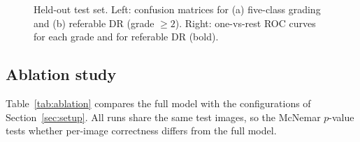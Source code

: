 \begin{figure}[!htbp]
\centering
\begin{minipage}[c]{0.6\linewidth}\centering
{}
\end{minipage}\hfill
\begin{minipage}[c]{0.37\linewidth}\centering
{}
\end{minipage}
\caption{Held-out test set. Left: confusion matrices for (a) five-class grading and (b) referable DR (grade $\geq2$).
Right: one-vs-rest ROC curves for each grade and for referable DR (bold).}
\label{fig:cm}
\end{figure}

\subsection{Ablation study}
Table~\ref{tab:ablation} compares the full model with the configurations of Section~\ref{sec:setup}. All runs share
the same test images, so the McNemar $p$-value tests whether per-image correctness differs from the full model.

